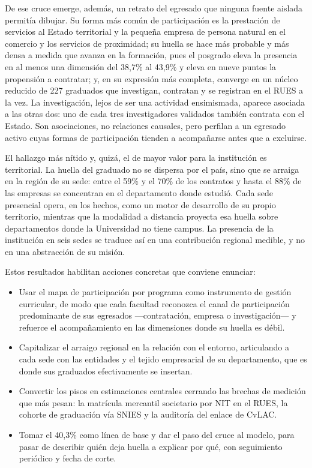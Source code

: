 De ese cruce emerge, además, un retrato del egresado que ninguna fuente aislada permitía dibujar. Su forma más común de participación es la prestación de servicios al Estado territorial y la pequeña empresa de persona natural en el comercio y los servicios de proximidad; su huella se hace más probable y más densa a medida que avanza en la formación, pues el posgrado eleva la presencia en al menos una dimensión del 38,7\% al 43,9\% y eleva en nueve puntos la propensión a contratar; y, en su expresión más completa, converge en un núcleo reducido de 227 graduados que investigan, contratan y se registran en el RUES a la vez. La investigación, lejos de ser una actividad ensimismada, aparece asociada a las otras dos: uno de cada tres investigadores validados también contrata con el Estado. Son asociaciones, no relaciones causales, pero perfilan a un egresado activo cuyas formas de participación tienden a acompañarse antes que a excluirse.

El hallazgo más nítido y, quizá, el de mayor valor para la institución es territorial. La huella del graduado no se dispersa por el país, sino que se arraiga en la región de su sede: entre el 59\% y el 70\% de los contratos y hasta el 88\% de las empresas se concentran en el departamento donde estudió. Cada sede presencial opera, en los hechos, como un motor de desarrollo de su propio territorio, mientras que la modalidad a distancia proyecta esa huella sobre departamentos donde la Universidad no tiene campus. La presencia de la institución en seis sedes se traduce así en una contribución regional medible, y no en una abstracción de su misión.

Estos resultados habilitan acciones concretas que conviene enunciar:
\begin{itemize}\setlength\itemsep{2pt}
  \item Usar el mapa de participación por programa como instrumento de gestión curricular, de modo que cada facultad reconozca el canal de participación predominante de sus egresados ---contratación, empresa o investigación--- y refuerce el acompañamiento en las dimensiones donde su huella es débil.
  \item Capitalizar el arraigo regional en la relación con el entorno, articulando a cada sede con las entidades y el tejido empresarial de su departamento, que es donde sus graduados efectivamente se insertan.
  \item Convertir los pisos en estimaciones centrales cerrando las brechas de medición que más pesan: la matrícula mercantil societario por NIT en el RUES, la cohorte de graduación vía SNIES y la auditoría del enlace de CvLAC.
  \item Tomar el 40,3\% como línea de base y dar el paso del cruce al modelo, para pasar de describir quién deja huella a explicar por qué, con seguimiento periódico y fecha de corte.
\end{itemize}

